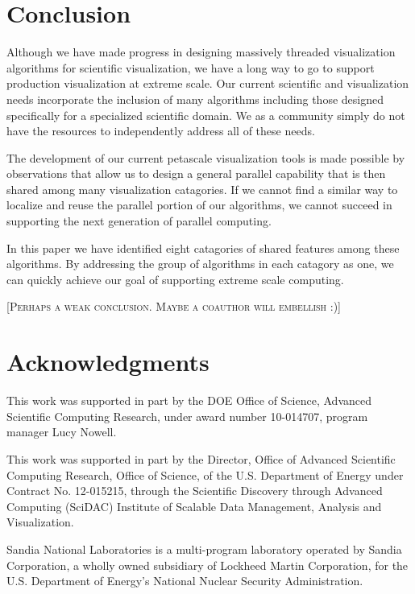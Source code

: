 \documentclass{sig-alternate}
\newcommand{\fix}[1]{{\color{red}\textsc{[#1]}}}
\begin{document}
\section{Conclusion}
\label{sec:Conclusion}

\noindent
Although we have made progress in designing massively threaded
visualization algorithms for scientific visualization, we have a long way
to go to support production visualization at extreme scale. Our current
scientific and visualization needs incorporate the inclusion of many
algorithms including those designed specifically for a specialized
scientific domain. We as a community simply do not have the resources to
independently address all of these needs.

The development of our current petascale visualization tools is made
possible by observations that allow us to design a general parallel
capability that is then shared among many visualization catagories. If we
cannot find a similar way to localize and reuse the parallel portion of our
algorithms, we cannot succeed in supporting the next generation of parallel
computing.

In this paper we have identified eight catagories of shared features among
these algorithms. By addressing the group of algorithms in each catagory as
one, we can quickly achieve our goal of supporting extreme scale computing.

\fix{Perhaps a weak conclusion. Maybe a coauthor will embellish :)}


\section{Acknowledgments}

\noindent
This work was supported in part by the DOE Office of Science, Advanced
Scientific Computing Research, under award number 10-014707, program
manager Lucy Nowell.

This work was supported in part by the Director, Office of Advanced
Scientific Computing Research, Office of Science, of the U.S. Department of
Energy under Contract No. 12-015215, through the Scientific Discovery
through Advanced Computing (SciDAC) Institute of Scalable Data Management,
Analysis and Visualization.

Sandia National Laboratories is a multi-program laboratory operated by
Sandia Corporation, a wholly owned subsidiary of Lockheed Martin
Corporation, for the U.S. Department of Energy's National Nuclear Security
Administration.




\end{document}
